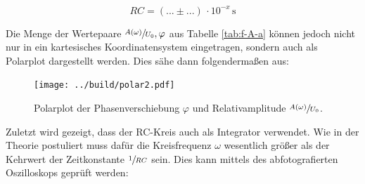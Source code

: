\begin{equation}
    RC = \left(... \pm ...\right)\,\cdot 10^{-x}\,\unit{\second}
\end{equation}


\noindent Die Menge der Wertepaare ${\sfrac{A(\omega)}{U_0},\varphi}$ aus Tabelle \ref{tab:f-A-a} können jedoch nicht nur in ein kartesisches Koordinatensystem eingetragen, sondern
auch als Polarplot dargestellt werden. Dies sähe dann folgendermaßen aus:

\begin{figure}
    \centering
    \texttt{[image: ../build/polar2.pdf]}
    \caption{Polarplot der Phasenverschiebung $\varphi$ und Relativamplitude $\sfrac{A(\omega)}{U_0}$.}
\end{figure}

\noindent Zuletzt wird gezeigt, dass der RC-Kreis auch als Integrator verwendet. Wie in der Theorie postuliert muss dafür die Kreisfrequenz $\omega$
wesentlich größer als der Kehrwert der Zeitkonstante $\sfrac{1}{RC}$ sein. Dies kann mittels des abfotografierten Oszilloskops geprüft werden:

